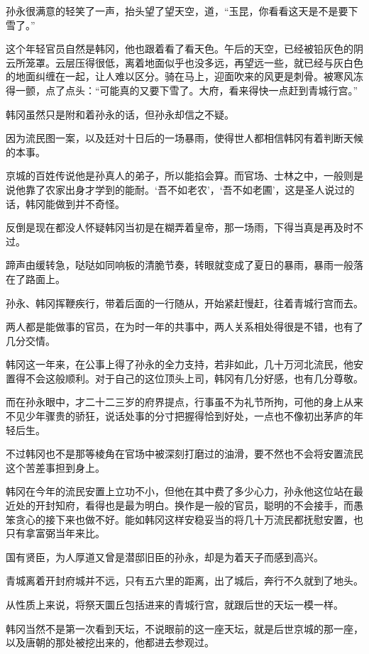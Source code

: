 孙永很满意的轻笑了一声，抬头望了望天空，道，“玉昆，你看看这天是不是要下雪了。”

这个年轻官员自然是韩冈，他也跟着看了看天色。午后的天空，已经被铅灰色的阴云所笼罩。云层压得很低，离着地面似乎也没多远，再望远一些，就已经与灰白色的地面纠缠在一起，让人难以区分。骑在马上，迎面吹来的风更是刺骨。被寒风冻得一颤，点了点头：“可能真的又要下雪了。大府，看来得快一点赶到青城行宫。”

韩冈虽然只是附和着孙永的话，但孙永却信之不疑。

因为流民图一案，以及廷对十日后的一场暴雨，使得世人都相信韩冈有着判断天候的本事。

京城的百姓传说他是孙真人的弟子，所以能掐会算。而官场、士林之中，一般则是说他靠了农家出身才学到的能耐。‘吾不如老农’，‘吾不如老圃’，这是圣人说过的话，韩冈能做到并不奇怪。

反倒是现在都没人怀疑韩冈当初是在糊弄着皇帝，那一场雨，下得当真是再及时不过。

蹄声由缓转急，哒哒如同响板的清脆节奏，转眼就变成了夏日的暴雨，暴雨一般落在了路面上。

孙永、韩冈挥鞭疾行，带着后面的一行随从，开始紧赶慢赶，往着青城行宫而去。

两人都是能做事的官员，在为时一年的共事中，两人关系相处得很是不错，也有了几分交情。

韩冈这一年来，在公事上得了孙永的全力支持，若非如此，几十万河北流民，他安置得不会这般顺利。对于自己的这位顶头上司，韩冈有几分好感，也有几分尊敬。

而在孙永眼中，才二十二三岁的府界提点，行事虽不为礼节所拘，可他的身上从来不见少年骤贵的骄狂，说话处事的分寸把握得恰到好处，一点也不像初出茅庐的年轻后生。

不过韩冈也不是那等棱角在官场中被深刻打磨过的油滑，要不然也不会将安置流民这个苦差事担到身上。

韩冈在今年的流民安置上立功不小，但他在其中费了多少心力，孙永他这位站在最近处的开封知府，看得也是最为明白。换作是一般的官员，聪明的不会接手，而愚笨贪心的接下来也做不好。能如韩冈这样安稳妥当的将几十万流民都抚慰安置，也只有拿富弼当年来比。

国有贤臣，为人厚道又曾是潜邸旧臣的孙永，却是为着天子而感到高兴。

青城离着开封府城并不远，只有五六里的距离，出了城后，奔行不久就到了地头。

从性质上来说，将祭天圜丘包括进来的青城行宫，就跟后世的天坛一模一样。

韩冈当然不是第一次看到天坛，不说眼前的这一座天坛，就是后世京城的那一座，以及唐朝的那处被挖出来的，他都进去参观过。

